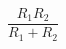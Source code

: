 \documentclass[12pt]{amsart}
\begin{document}
\sicpsize
\[
\frac{R_1R_2}{R_1 + R_2}
\]
\end{document}

